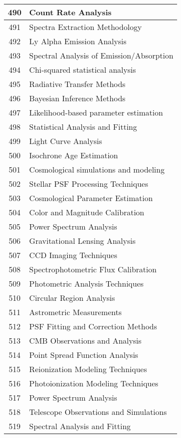 \begin{table}[htbp]
\begin{tabular}{|c|l|}
\hline
490 & Count Rate Analysis \\
\hline
491 & Spectra Extraction Methodology \\
\hline
492 & Ly Alpha Emission Analysis \\
\hline
493 & Spectral Analysis of Emission/Absorption \\
\hline
494 & Chi-squared statistical analysis \\
\hline
495 & Radiative Transfer Methods \\
\hline
496 & Bayesian Inference Methods \\
\hline
497 & Likelihood-based parameter estimation \\
\hline
498 & Statistical Analysis and Fitting \\
\hline
499 & Light Curve Analysis \\
\hline
500 & Isochrone Age Estimation \\
\hline
501 & Cosmological simulations and modeling \\
\hline
502 & Stellar PSF Processing Techniques \\
\hline
503 & Cosmological Parameter Estimation \\
\hline
504 & Color and Magnitude Calibration \\
\hline
505 & Power Spectrum Analysis \\
\hline
506 & Gravitational Lensing Analysis \\
\hline
507 & CCD Imaging Techniques \\
\hline
508 & Spectrophotometric Flux Calibration \\
\hline
509 & Photometric Analysis Techniques \\
\hline
510 & Circular Region Analysis \\
\hline
511 & Astrometric Measurements \\
\hline
512 & PSF Fitting and Correction Methods \\
\hline
513 & CMB Observations and Analysis \\
\hline
514 & Point Spread Function Analysis \\
\hline
515 & Reionization Modeling Techniques \\
\hline
516 & Photoionization Modeling Techniques \\
\hline
517 & Power Spectrum Analysis \\
\hline
518 & Telescope Observations and Simulations \\
\hline
519 & Spectral Analysis and Fitting \\
\hline

\end{tabular}
\end{table}
